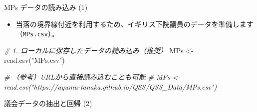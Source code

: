 \documentclass[
  ignorenonframetext,
]{beamer}
\newenvironment{Shaded}{\begin{snugshade}}{\end{snugshade}}
\newcommand{\AttributeTok}[1]{\textcolor[rgb]{0.77,0.63,0.00}{#1}}
\newcommand{\CommentTok}[1]{\textcolor[rgb]{0.56,0.35,0.01}{\textit{#1}}}
\newcommand{\DecValTok}[1]{\textcolor[rgb]{0.00,0.00,0.81}{#1}}
\newcommand{\FunctionTok}[1]{\textcolor[rgb]{0.00,0.00,0.00}{#1}}
\newcommand{\NormalTok}[1]{#1}
\newcommand{\OtherTok}[1]{\textcolor[rgb]{0.56,0.35,0.01}{#1}}
\newcommand{\SpecialCharTok}[1]{\textcolor[rgb]{0.00,0.00,0.00}{#1}}
\newcommand{\StringTok}[1]{\textcolor[rgb]{0.31,0.60,0.02}{#1}}
\providecommand{\tightlist}{%
  \setlength{\itemsep}{0pt}\setlength{\parskip}{0pt}}
\begin{document}
\begin{frame}[fragile]{MPs データの読み込み (1)}
\protect\hypertarget{mps-ux30c7ux30fcux30bfux306eux8aadux307fux8fbcux307f-1}{}
\begin{itemize}
\tightlist
\item
  当落の境界線付近を利用するため、イギリス下院議員のデータを準備します（\texttt{MPs.csv}）。
\end{itemize}

\scriptsize

\begin{Shaded}
\begin{Highlighting}[]
\CommentTok{\# 1. ローカルに保存したデータの読み込み（推奨）}
\NormalTok{MPs }\OtherTok{\textless{}{-}} \FunctionTok{read.csv}\NormalTok{(}\StringTok{"MPs.csv"}\NormalTok{)}

\CommentTok{\# （参考）URLから直接読み込むことも可能}
\CommentTok{\# MPs \textless{}{-} read.csv("https://ayumu{-}tanaka.github.io/QSS/QSS\_Data/MPs.csv")}
\end{Highlighting}
\end{Shaded}

\normalsize
\end{frame}

\begin{frame}[fragile]{議会データの抽出と回帰 (2)}
\protect\hypertarget{ux8b70ux4f1aux30c7ux30fcux30bfux306eux62bdux51faux3068ux56deux5e30-2}{}
\scriptsize

\begin{Shaded}
\end{Shaded}

\normalsize
\end{frame}
\end{document}
